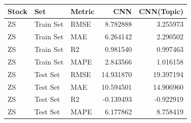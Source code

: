 \begin{tabular}{lllrr}
\toprule
Stock & Set & Metric & CNN & CNN(Topic) \\
\midrule
ZS & Train Set & RMSE & 8.782888 & 3.255973 \\
ZS & Train Set & MAE & 6.264142 & 2.290502 \\
ZS & Train Set & R2 & 0.981540 & 0.997463 \\
ZS & Train Set & MAPE & 2.843566 & 1.016158 \\
ZS & Test Set & RMSE & 14.931870 & 19.397194 \\
ZS & Test Set & MAE & 10.594501 & 14.906960 \\
ZS & Test Set & R2 & -0.139493 & -0.922919 \\
ZS & Test Set & MAPE & 6.177862 & 8.758419 \\
\bottomrule
\end{tabular}
